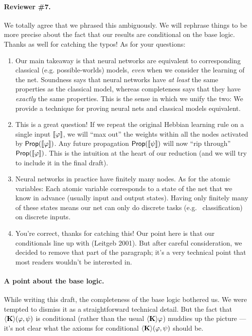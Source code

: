 \documentclass[letterpaper]{article}
\theoremstyle{definition}
\newcommand{\semantics}[1]{[\![\mbox{\em $ #1 $\/}]\!]}
\newcommand{\Prop}{\textsf{Prop}}
\newcommand{\diaKnow}[2]{\langle \textrm{\textup{\textbf{K}}} \rangle(#1, #2)}
\newcommand{\diaKnowNoArgs}{\langle \textrm{\textup{\textbf{K}}} \rangle}
\begin{document}
\paragraph{Reviewer \#7.}
We totally agree that we phrased this ambiguously. We will rephrase things to be more precise about the fact that our results are conditional on the base logic.  Thanks as well for catching the typos!  As for your questions:
\begin{enumerate}
    \item Our main takeaway is that neural networks are equivalent to corresponding classical (e.g. possible-worlds) models, \emph{even} when we consider the learning of the net.  Soundness says that neural networks have \textit{at least} the same properties as the classical model, whereas completeness says that they have \textit{exactly} the same properties.  This is the sense in which we unify the two: We provide a technique for proving neural nets and classical models equivalent.
    
    \item This is a great question!  If we repeat the original Hebbian learning rule on a single input $\semantics{\varphi}$, we will ``max out'' the weights within all the nodes activated by $\Prop(\semantics{\varphi})$.  Any future propagation $\Prop(\semantics{\psi})$ will now ``rip through'' $\Prop(\semantics{\varphi})$.  This is the intuition at the heart of our reduction (and we will try to include it in the final draft).
    
    \item Neural networks in practice have finitely many nodes.  As for the atomic variables:  Each atomic variable corresponds to a state of the net that we know in advance (usually input and output states).  
    Having only finitely many of these states means our net can only do discrete tasks (e.g.~ classification) on discrete inputs.
    
    \item You're correct, thanks for catching this!  Our point here is that our conditionals line up with (Leitgeb 2001).  But after careful consideration, we decided to remove that part of the paragraph; it’s a very technical point that most readers wouldn't be interested in.
\end{enumerate}

\paragraph{A point about the base logic.}
While writing this draft, the completeness of the base logic bothered us.  We were tempted to dismiss it as a straightforward technical detail.  But the fact that $\diaKnow{\varphi}{\psi}$ is conditional (rather than the usual $\diaKnowNoArgs \varphi$) muddies up the picture --- it’s not clear what the axioms for conditional $\diaKnow{\varphi}{\psi}$ should be.
\end{document}
